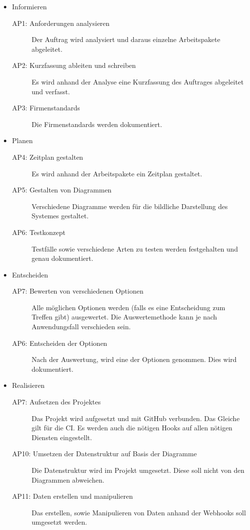 \begin{itemize}
    \item Informieren
    \begin{description}
        \item[\gls{AP}1: Anforderungen analysieren] Der Auftrag wird analysiert und daraus einzelne Arbeitspakete abgeleitet. 
        \item[AP2: Kurzfassung ableiten und schreiben] Es wird anhand der Analyse eine Kurzfassung des Auftrages abgeleitet und verfasst.
        \item[AP3: Firmenstandards] Die Firmenstandards werden dokumentiert.
    \end{description}
    \item Planen
    \begin{description}
        \item[AP4: Zeitplan gestalten] Es wird anhand der Arbeitspakete ein Zeitplan gestaltet.
        \item[AP5: Gestalten von Diagrammen] Verschiedene Diagramme werden für die bildliche Darstellung des Systemes gestaltet.
        \item[AP6: Testkonzept] Testfälle sowie verschiedene Arten zu testen werden festgehalten und genau dokumentiert.
    \end{description}
    \item Entscheiden
    \begin{description}
        \item[AP7: Bewerten von verschiedenen Optionen] Alle möglichen Optionen werden (falls es eine Entscheidung zum Treffen gibt) ausgewertet. Die Auswertemethode kann je nach Anwendungsfall verschieden sein.
        \item[AP6: Entscheiden der Optionen] Nach der Auswertung, wird eine der Optionen genommen. Dies wird dokumentiert.
    \end{description}
    \item Realisieren
    \begin{description}
        \item[AP7: Aufsetzen des Projektes] Das Projekt wird aufgesetzt und mit GitHub verbunden. Das Gleiche gilt für die CI. \newline
        Es werden auch die nötigen Hooks auf allen nötigen Diensten eingestellt.
        \item[AP10: Umsetzen der Datenstruktur auf Basis der Diagramme] Die Datenstruktur wird im Projekt umgesetzt. Diese soll nicht von den Diagrammen abweichen.
        \item[AP11: Daten erstellen und manipulieren] Das erstellen, sowie Manipulieren von Daten anhand der Webhooks soll umgesetzt werden.

\end{description}
\end{itemize}
